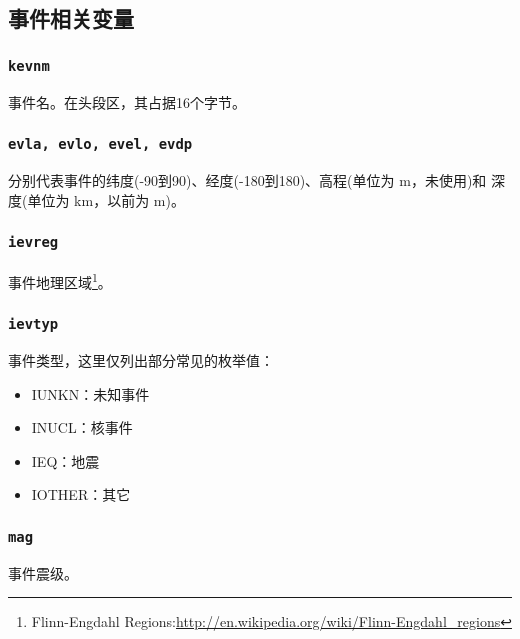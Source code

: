 \subsection{事件相关变量}
\subsubsection{\texttt{kevnm}}
事件名。在头段区，其占据16个字节。

\subsubsection{\texttt{evla, evlo, evel, evdp}}
分别代表事件的纬度(-90到90)、经度(-180到180)、高程(单位为 \si{\m}，未使用)和
深度(单位为 \si{\km}，以前为 \si{\m})。

\subsubsection{\texttt{ievreg}\dag}
事件地理区域\footnote{Flinn-Engdahl Regions:\url{http://en.wikipedia.org/wiki/Flinn-Engdahl_regions}}。

\subsubsection{\texttt{ievtyp}}
事件类型，这里仅列出部分常见的枚举值：
\begin{itemize}
\ttfamily
\item IUNKN：未知事件
\item INUCL：核事件
\item IEQ：地震
\item IOTHER：其它
\end{itemize}

\subsubsection{\texttt{mag}}
事件震级。

